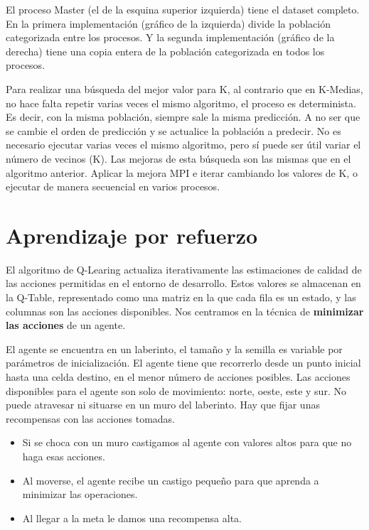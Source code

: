		El proceso Master (el de la esquina superior izquierda) tiene el dataset completo. En la primera implementación (gráfico de la izquierda) divide la población categorizada entre los procesos. Y la segunda implementación (gráfico de la derecha) tiene una copia entera de la población categorizada en todos los procesos.
		
		
		Para realizar una búsqueda del mejor valor para K, al contrario que en K-Medias, no hace falta repetir varias veces el mismo algoritmo, el proceso es determinista. Es decir, con la misma población, siempre sale la misma predicción. A no ser que se cambie el orden de predicción y se actualice la población a predecir. No es necesario ejecutar varias veces el mismo algoritmo, pero sí puede ser útil variar el número de vecinos (K). Las mejoras de esta búsqueda son las mismas que en el algoritmo anterior. Aplicar la mejora MPI e iterar cambiando los valores de K, o ejecutar de manera secuencial en varios procesos.

\newpage

\section{Aprendizaje por refuerzo}
	El algoritmo de Q-Learing actualiza iterativamente las estimaciones de calidad de las acciones permitidas en el entorno de desarrollo. Estos valores se almacenan en la Q-Table, representado como una matriz en la que cada fila es un estado, y las columnas son las acciones disponibles. Nos centramos en la técnica de \textbf{minimizar las acciones} de un agente. 
	
	El agente se encuentra en un laberinto, el tamaño y la semilla es variable por parámetros de inicialización. El agente tiene que recorrerlo desde un punto inicial hasta una celda destino, en el menor número de acciones posibles. Las acciones disponibles para el agente son solo de movimiento: norte, oeste, este y sur. No puede atravesar ni situarse en un muro del laberinto. Hay que fijar unas recompensas con las acciones tomadas. 	
	\begin{itemize}
		\item Si se choca con un muro castigamos al agente con valores altos para que no haga esas acciones.
		\item Al moverse, el agente recibe un castigo pequeño para que aprenda a minimizar las operaciones.
		\item Al llegar a la meta le damos una recompensa alta. 		
	\end{itemize}
	
